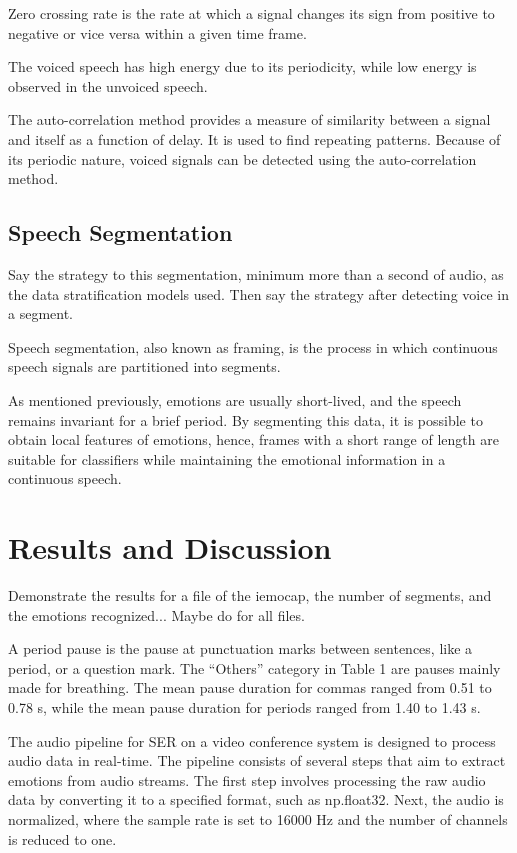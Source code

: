 Zero crossing rate is the rate at which a signal changes its sign from positive to negative or vice versa within a given time frame.

The voiced speech has high energy due to its periodicity, while low energy is observed in the unvoiced speech.

The auto-correlation method provides a measure of similarity between a signal and itself as a function of delay. It is used to find repeating patterns. Because of its periodic nature, voiced signals can be detected using the auto-correlation method.


\subsection{Speech Segmentation}

Say the strategy to this segmentation, minimum more than a second of audio, as the data stratification models used. Then say the strategy after detecting voice in a segment.


Speech segmentation, also known as framing, is the process in which continuous speech signals are partitioned into segments.

As mentioned previously, emotions are usually short-lived, and the speech remains invariant for a brief period. By segmenting this data, it is possible to obtain local features of emotions, hence, frames with a short range of length are suitable for classifiers while maintaining the emotional information in a continuous speech.



\section{Results and Discussion}


Demonstrate the results for a file of the iemocap, the number of segments, and the emotions recognized... Maybe do for all files.


A period pause is the pause at punctuation marks between sentences, like a period, or a question mark. The “Others” category in Table 1 are pauses mainly made for breathing. The mean pause duration for commas ranged from 0.51 to 0.78 s, while the mean pause duration for periods ranged from 1.40 to 1.43 s.


The audio pipeline for SER on a video conference system is designed to process audio data in real-time. The pipeline consists of several steps that aim to extract emotions from audio streams. The first step involves processing the raw audio data by converting it to a specified format, such as np.float32. Next, the audio is normalized, where the sample rate is set to 16000 Hz and the number of channels is reduced to one.

